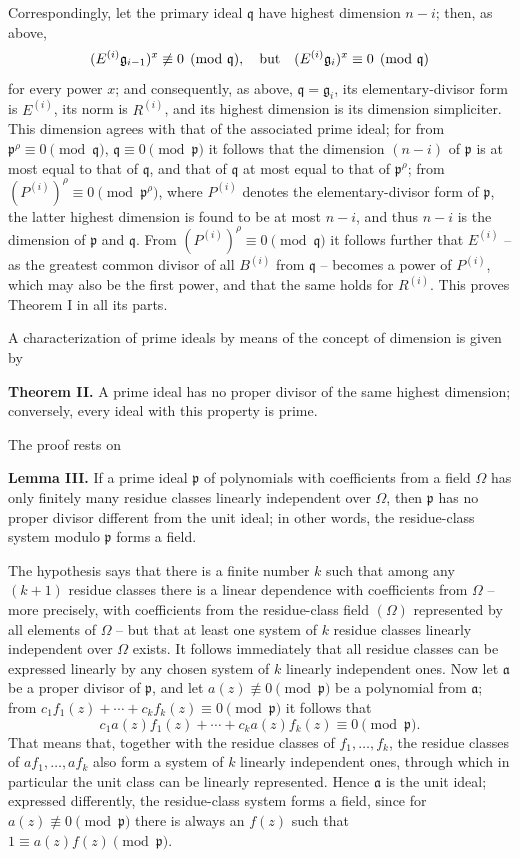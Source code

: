 \documentclass[11pt]{article}
\providecommand{\frakp}{\mathfrak p}
\providecommand{\frakq}{\mathfrak q}
\providecommand{\fraka}{\mathfrak a}
\providecommand{\frakg}{\mathfrak g}
\begin{document}
Correspondingly, let the primary ideal $\frakq$ have highest dimension $n-i$; then, as above,
\[
 (E^{(i)}\frakg_{i-1})^x\not\equiv0\pmod{\frakq},\quad\hbox{but}\quad
 (E^{(i)}\frakg_i)^x\equiv0\pmod{\frakq}
\]
for every power $x$; and consequently, as above, $\frakq=\frakg_i$, its elementary-divisor form is $E^{(i)}$, its norm is $R^{(i)}$, and its highest dimension is its dimension simpliciter. This dimension agrees with that of the associated prime ideal; for from $\frakp^\rho\equiv0\pmod{\frakq}$, $\frakq\equiv0\pmod{\frakp}$ it follows that the dimension $(n-i)$ of $\frakp$ is at most equal to that of $\frakq$, and that of $\frakq$ at most equal to that of $\frakp^\rho$; from $(P^{(i)})^\rho\equiv0\pmod{\frakp^\rho}$, where $P^{(i)}$ denotes the elementary-divisor form of $\frakp$, the latter highest dimension is found to be at most $n-i$, and thus $n-i$ is the dimension of $\frakp$ and $\frakq$. From $(P^{(i)})^\rho\equiv0\pmod{\frakq}$ it follows further that $E^{(i)}$ -- as the greatest common divisor of all $B^{(i)}$ from $\frakq$ -- becomes a power of $P^{(i)}$, which may also be the first power, and that the same holds for $R^{(i)}$. This proves Theorem I in all its parts.

A characterization of prime ideals by means of the concept of dimension is given by

\textbf{Theorem II.} A prime ideal has no proper divisor of the same highest dimension; conversely, every ideal with this property is prime.

The proof rests on

\textbf{Lemma III.} If a prime ideal $\frakp$ of polynomials with coefficients from a field $\Omega$ has only finitely many residue classes linearly independent over $\Omega$, then $\frakp$ has no proper divisor different from the unit ideal; in other words, the residue-class system modulo $\frakp$ forms a field.

The hypothesis says that there is a finite number $k$ such that among any $(k+1)$ residue classes there is a linear dependence with coefficients from $\Omega$ -- more precisely, with coefficients from the residue-class field $(\Omega)$ represented by all elements of $\Omega$ -- but that at least one system of $k$ residue classes linearly independent over $\Omega$ exists. It follows immediately that all residue classes can be expressed linearly by any chosen system of $k$ linearly independent ones. Now let $\fraka$ be a proper divisor of $\frakp$, and let $a(z)\not\equiv0\pmod{\frakp}$ be a polynomial from $\fraka$; from $c_1f_1(z)+\cdots+c_kf_k(z)\equiv0\pmod{\frakp}$ it follows that
\[
 c_1a(z)f_1(z)+\cdots+c_ka(z)f_k(z)\equiv0\pmod{\frakp}.
\]
That means that, together with the residue classes of $f_1,\ldots,f_k$, the residue classes of $af_1,\ldots,af_k$ also form a system of $k$ linearly independent ones, through which in particular the unit class can be linearly represented. Hence $\fraka$ is the unit ideal; expressed differently, the residue-class system forms a field, since for $a(z)\not\equiv0\pmod{\frakp}$ there is always an $f(z)$ such that $1\equiv a(z)f(z)\pmod{\frakp}$.
\end{document}
